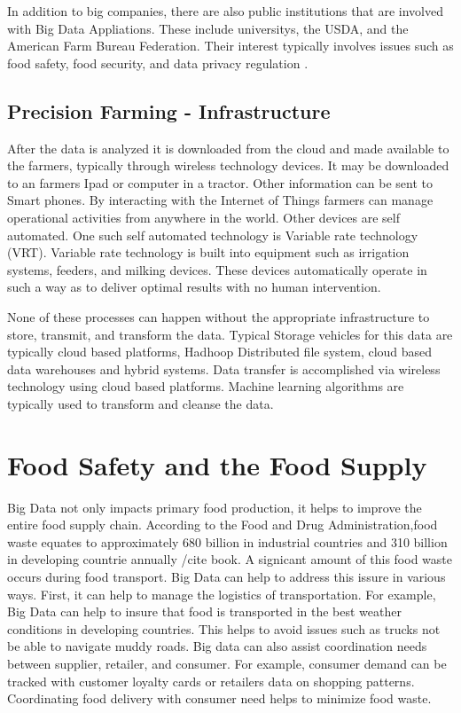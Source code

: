 \documentclass[sigconf]{acmart}
\begin{document}
In addition to big companies, there are also public institutions that are involved with Big Data Appliations. These include universitys, the USDA, and the American Farm Bureau Federation. Their interest typically involves issues such as food safety, food security, and data privacy regulation \cite {article}. 

\subsection{Precision Farming - Infrastructure}

After the data is analyzed it is downloaded from the cloud and made available to the farmers, typically through wireless technology devices. It may be downloaded to an farmers Ipad or computer in a tractor. Other information can be sent to Smart phones. By interacting with the Internet of Things farmers can manage operational activities from anywhere in the world. Other devices are self automated. One such self automated technology is Variable rate technology (VRT). Variable rate technology is built into equipment such as irrigation systems, feeders, and milking devices. These devices automatically operate in such a way as to deliver optimal results with no human intervention.

None of these processes can happen without the appropriate infrastructure to store, transmit, and transform the data. Typical Storage vehicles for this data are typically cloud based platforms, Hadhoop Distributed file system, cloud based data warehouses and hybrid systems. Data transfer is accomplished via wireless technology using cloud based platforms. Machine learning algorithms are typically used to transform and cleanse the data. \cite {article}

\section{Food Safety and the Food Supply}

Big Data not only impacts primary food production, it helps to improve the entire food supply chain. According to the Food and Drug Administration,food waste equates to approximately 680 billion in industrial countries and 310 billion in developing countrie annually /cite {book}. A signicant amount of this food waste occurs during food transport. Big Data can help to address this issure in various ways. First, it can help to manage the logistics of transportation. For example, Big Data can help to insure that food is transported in the best weather conditions in developing countries. This helps to avoid issues such as trucks not be able to navigate muddy roads. Big data can also assist coordination needs between supplier, retailer, and consumer. For example, consumer demand can be tracked with customer loyalty cards or retailers data on shopping patterns. Coordinating food delivery with consumer need helps to minimize food waste.
\end{document}
